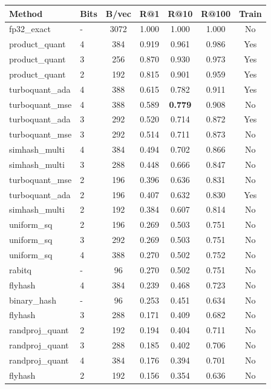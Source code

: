 \begin{tabular}{llccccc}
\toprule
Method & Bits & B/vec & R@1 & R@10 & R@100 & Train \\
\midrule
fp32\_exact & - & 3072 & 1.000 & 1.000 & 1.000 & No \\
product\_quant & 4 & 384 & 0.919 & 0.961 & 0.986 & Yes \\
product\_quant & 3 & 256 & 0.870 & 0.930 & 0.973 & Yes \\
product\_quant & 2 & 192 & 0.815 & 0.901 & 0.959 & Yes \\
turboquant\_ada & 4 & 388 & 0.615 & 0.782 & 0.911 & Yes \\
turboquant\_mse & 4 & 388 & 0.589 & \textbf{0.779} & 0.908 & No \\
turboquant\_ada & 3 & 292 & 0.520 & 0.714 & 0.872 & Yes \\
turboquant\_mse & 3 & 292 & 0.514 & 0.711 & 0.873 & No \\
simhash\_multi & 4 & 384 & 0.494 & 0.702 & 0.866 & No \\
simhash\_multi & 3 & 288 & 0.448 & 0.666 & 0.847 & No \\
turboquant\_mse & 2 & 196 & 0.396 & 0.636 & 0.831 & No \\
turboquant\_ada & 2 & 196 & 0.407 & 0.632 & 0.830 & Yes \\
simhash\_multi & 2 & 192 & 0.384 & 0.607 & 0.814 & No \\
uniform\_sq & 2 & 196 & 0.269 & 0.503 & 0.751 & No \\
uniform\_sq & 3 & 292 & 0.269 & 0.503 & 0.751 & No \\
uniform\_sq & 4 & 388 & 0.270 & 0.502 & 0.752 & No \\
rabitq & - & 96 & 0.270 & 0.502 & 0.751 & No \\
flyhash & 4 & 384 & 0.239 & 0.468 & 0.723 & No \\
binary\_hash & - & 96 & 0.253 & 0.451 & 0.634 & No \\
flyhash & 3 & 288 & 0.171 & 0.409 & 0.682 & No \\
randproj\_quant & 2 & 192 & 0.194 & 0.404 & 0.711 & No \\
randproj\_quant & 3 & 288 & 0.185 & 0.402 & 0.706 & No \\
randproj\_quant & 4 & 384 & 0.176 & 0.394 & 0.701 & No \\
flyhash & 2 & 192 & 0.156 & 0.354 & 0.636 & No \\
\bottomrule
\end{tabular}

